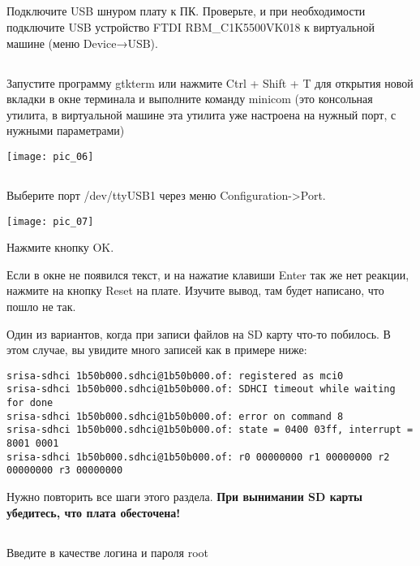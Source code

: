 \subsection{}Подключите USB шнуром плату к ПК. Проверьте, и при необходимости подключите USB устройство FTDI RBM\_C1K5500VK018 к виртуальной машине (меню Device→USB).

\subsection{} Запустите программу gtkterm или нажмите Ctrl + Shift + T для открытия новой вкладки в окне терминала и выполните команду minicom (это консольная утилита, в виртуальной машине эта утилита уже настроена на нужный порт, с нужными параметрами)
\begin{center}
	\texttt{[image: pic\_06]}
\end{center}

\subsection{} Выберите порт  /dev/ttyUSB1 через меню Configuration->Port.
\begin{center}
	\texttt{[image: pic\_07]}
\end{center}

Нажмите кнопку OK.

Если в окне не появился текст, и на нажатие клавиши Enter так же нет реакции,  нажмите на кнопку Reset на плате. Изучите вывод, там будет написано, что пошло не так.

Один из вариантов, когда при записи файлов на SD карту что-то побилось. В этом случае, вы увидите много записей как в примере ниже:
\begin{lstlisting}[style=stdout]
srisa-sdhci 1b50b000.sdhci@1b50b000.of: registered as mci0
srisa-sdhci 1b50b000.sdhci@1b50b000.of: SDHCI timeout while waiting for done
srisa-sdhci 1b50b000.sdhci@1b50b000.of: error on command 8
srisa-sdhci 1b50b000.sdhci@1b50b000.of: state = 0400 03ff, interrupt = 8001 0001
srisa-sdhci 1b50b000.sdhci@1b50b000.of: r0 00000000 r1 00000000 r2 00000000 r3 00000000
\end{lstlisting}

Нужно повторить все шаги этого раздела. \textbf{При вынимании SD карты убедитесь, что плата обесточена!}

\subsection{} Введите в качестве логина и пароля root

